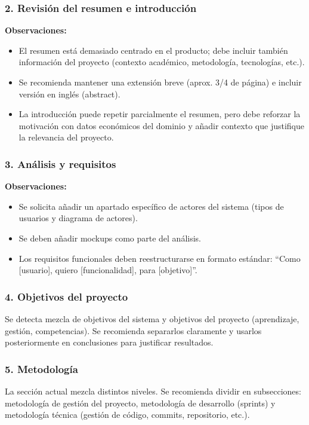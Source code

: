 \subsubsection*{2. Revisión del resumen e introducción}

\textbf{Observaciones:}
\begin{itemize}
    \item El resumen está demasiado centrado en el producto; debe incluir también información del proyecto (contexto académico, metodología, tecnologías, etc.).
    \item Se recomienda mantener una extensión breve (aprox. 3/4 de página) e incluir versión en inglés (abstract).
    \item La introducción puede repetir parcialmente el resumen, pero debe reforzar la motivación con datos económicos del dominio y añadir contexto que justifique la relevancia del proyecto.
\end{itemize}

\subsubsection*{3. Análisis y requisitos}

\textbf{Observaciones:}
\begin{itemize}
    \item Se solicita añadir un apartado específico de actores del sistema (tipos de usuarios y diagrama de actores).
    \item Se deben añadir mockups como parte del análisis.
    \item Los requisitos funcionales deben reestructurarse en formato estándar: ``Como [usuario], quiero [funcionalidad], para [objetivo]''.
\end{itemize}

\subsubsection*{4. Objetivos del proyecto}
Se detecta mezcla de objetivos del sistema y objetivos del proyecto (aprendizaje, gestión, competencias). Se recomienda separarlos claramente y usarlos posteriormente en conclusiones para justificar resultados.

\subsubsection*{5. Metodología}
La sección actual mezcla distintos niveles. Se recomienda dividir en subsecciones: metodología de gestión del proyecto, metodología de desarrollo (sprints) y metodología técnica (gestión de código, commits, repositorio, etc.).

